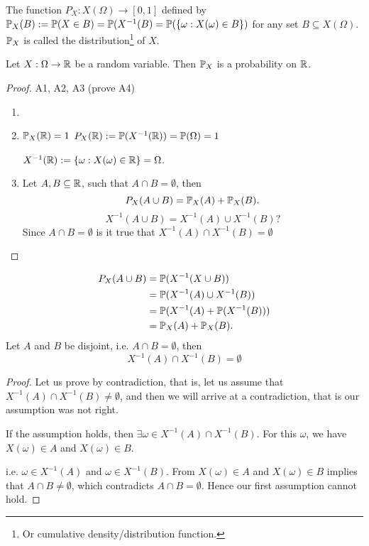 \documentclass[10pt, a4paper]{article}
\begin{document}
\begin{definition}
    The function $P_X : X(\Omega) \rightarrow [0, 1]$ defined by $\P_X(B) := \P(X \in B) = \P(X^{-1}(B) = \P(\{\omega : X(\omega) \in B\})$
    for any set $B \subseteq X(\Omega)$.
    $\P_X$ is called the distribution\footnote{Or cumulative density/distribution function.} of $X$.
\end{definition}

\begin{theorem}
    Let $X: \Omega \rightarrow \R$ be a random variable.
    Then $\P_X$ is a probability on $\R$.
    \begin{proof}
        A1, A2, A3 (prove A4)

        \begin{enumerate}[label = (A\arabic*)]
            \item
            \item $\P_X(\R) = 1$
            $P_X(\R) := \P(X ^ {-1}(\R)) = \P(\Omega) = 1$

            $X ^ {-1}(\R) := \{\omega : X(\omega) \in \R\} = \Omega$.
            \item Let $A, B \subseteq \R$, such that $A \cap B = \emptyset$, then
            \[
            P_X(A \cup B) = \P_X(A) + \P_X(B).
            \]
            \[
            X^{-1}(A \cup B) = X^{-1}(A) \cup X^{-1}(B)?
            \]
            Since $A \cap B = \emptyset$ is it true that $X^{-1}(A)\cap X^{-1}(B) = \emptyset$
        \end{enumerate}
    \end{proof}
\end{theorem}
\begin{align*}
P_X(A \cup B) &= \P(X ^ {-1}(X \cup B)) \\
&= \P(X ^ {-1}(A) \cup X ^ {-1}(B)) \\
&= \P(X ^ {-1}(A) + \P(X ^ {-1}(B))) \\
&= \P_X(A) + \P_X(B).
\end{align*}
Let $A$ and $B$ be disjoint, i.e. $A \cap B = \emptyset$,
then
\[
X ^ {-1}(A) \cap X ^ {-1}(B) = \emptyset
\]
\begin{proof}
    Let us prove by contradiction,
    that is, let us assume that $X ^ {-1}(A) \cap X ^ {-1}(B) \neq \emptyset$,
    and then we will arrive at a contradiction,
    that is our assumption was not right.

    If the assumption holds,
    then $\exists \omega \in X ^ {-1}(A) \cap X ^ {-1}(B)$.
    For this $\omega$,
    we have $X(\omega) \in A$ and $X(\omega) \in B$.

    i.e. $\omega \in X ^ {-1}(A)$ and $\omega \in X ^ {-1}(B)$.
    From $X(\omega) \in A$ and $X(\omega) \in B$ implies that $A \cap B \neq \emptyset$,
    which contradicts $A \cap B = \emptyset$.
    Hence our first assumption cannot hold.
\end{proof}
\end{document}
